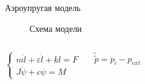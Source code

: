 \documentclass[ignoreonframetext,unicode]{beamer}
\begin{document}
\begin{frame}{Аэроупругая модель}
	\vspace*{-9mm}
	\begin{figure}[!htbp]
		\caption{Схема модели}
		\label{pruzina}
	\end{figure}	

\vspace*{-5mm}
	\begin{columns}
			\begin{block}{}
				\vspace*{-1mm}
			\begin{equation*}
				\begin{cases*}
					m \ddot{l} + \varepsilon \dot{l} + k l  = F \\
					J \ddot{\psi} + c \psi = M
				\end{cases*}
				\label{lagrsdfdsfsange_fin}
			\end{equation*}
		\end{block}
		\column{0.5\textwidth}
		\begin{block}{}
			\begin{equation*}
				\tilde{\tilde{p}} = p_i - p_{ext}
			\end{equation*}
		\end{block}
	\end{columns}
	

\end{frame}
\end{document}

